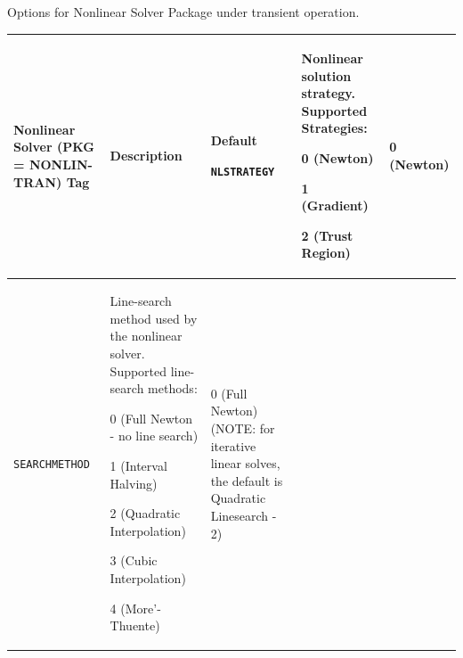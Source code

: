 

\small
\caption[Options for Nonlinear Solver Package under transient
operation.] {Options for Nonlinear Solver Package under transient
operation.\label{Nonlin-TranPKG}}
\begin{longtable}[htbp]{|>{\setlength{\hsize}{.9\hsize}}Y|
>{\setlength{\hsize}{1.2\hsize}}Y|
>{\setlength{\hsize}{.9\hsize}}Y|} \hline

\color{white}\textbf{Nonlinear Solver (PKG =
NONLIN-TRAN) Tag} & \color{white}\bf Description
& \color{white}\bf Default \endhead


\texttt{NLSTRATEGY} & Nonlinear solution strategy.  Supported Strategies:
\begin{XyceItemize}
\item 0 (Newton)
\item 1 (Gradient)
\item 2 (Trust Region)
\end{XyceItemize} &
0 (Newton) \\ \hline

\texttt{SEARCHMETHOD} &
Line-search method used by the nonlinear solver.  Supported
line-search methods:
\begin{XyceItemize}
\item 0 (Full Newton - no line search)
\item 1 (Interval Halving)
\item 2 (Quadratic Interpolation)
\item 3 (Cubic Interpolation)
\item 4 (More'-Thuente)
\end{XyceItemize} &
0 (Full Newton) (NOTE: for iterative linear solves, the default is Quadratic
Linesearch - 2) \\ \hline


\end{longtable}
